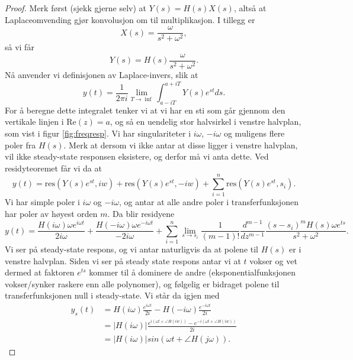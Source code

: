 \documentclass{article}
\begin{document}
\begin{proof}
    Merk først (sjekk gjerne selv) at $Y(s) = H(s) X(s)$, altså at Laplaceomvending gjør konvolusjon om til multiplikasjon. I tillegg er \[
        X(s) = \frac{\omega}{s^2 + \omega^2},
    \] så vi får 
    \[
        Y(s) = H(s) \frac{\omega}{s^2 + \omega^2}.
    \]
    Nå anvender vi definisjonen av Laplace-invers, slik at
    \[
     y(t) = \frac{1}{2\pi i} \lim_{T\to\inf} \int_{a-iT}^{a+iT} Y(s) e^{st} ds.
    \]
    For å beregne dette integralet tenker vi at vi har en sti som går gjennom den vertikale linjen i $\mathrm{Re}(z) = a$, og så en uendelig stor halvsirkel i venstre halvplan, som vist i figur \ref{fig:freqresp}. Vi har singulariteter i $i\omega$, $-i\omega$ og muligens flere poler fra $H(s)$. Merk at dersom vi ikke antar at disse ligger i venstre halvplan, vil ikke steady-state responsen eksistere, og derfor må vi anta dette. Ved residyteoremet får vi da at
    \[
    y(t) = \mathrm{res}(Y(s)e^{st}, iw) + \mathrm{res}(Y(s)e^{st}, -iw) + \sum_{i = 1}^n \mathrm{res}(Y(s)e^{st}, s_i).    
    \]
    Vi har simple poler i $i\omega$ og $-i\omega$, og antar at alle andre poler i transferfunksjonen har poler av høyest orden $m$. Da blir residyene 
    \[
    y(t) = \frac{H(i\omega)\omega e^{i\omega t}}{2i\omega} + \frac{H(-i\omega)\omega e^{-i\omega t}}{-2i\omega} + \sum_{i = 1}^n \lim_{s \to s_i} \frac{1}{(m  - 1)!} \frac{d^{m - 1}}{dz^{m  -1}} \frac{(s-s_i)^m H(s)\omega e^{ts}}{s^2 + \omega^2}.
    \]
    Vi ser på steady-state respons, og vi antar naturligvis da at polene til $H(s)$ er i venstre halvplan. Siden vi ser på steady state respons antar vi at $t$ vokser og vet dermed at faktoren $e^{ts}$ kommer til å dominere de andre (eksponentialfunksjonen vokser/synker raskere enn alle polynomer), og følgelig er bidraget polene til transferfunksjonen null i steady-state. Vi står da igjen med
    \begin{align}
        y_s(t) & = H(i\omega)\frac{e^{i\omega t}}{2i} - H(-i\omega)\frac{e^{-i\omega t}}{2i} \\
        & = |H(i\omega)| \frac{e^{i(\omega t + \angle H(iw))} - e^{-i(\omega t + \angle H(iw))}}{2i} \\
        & = |H(i\omega)| sin(\omega t + \angle H(j \omega)).
    \end{align}
\end{proof}
\end{document}
